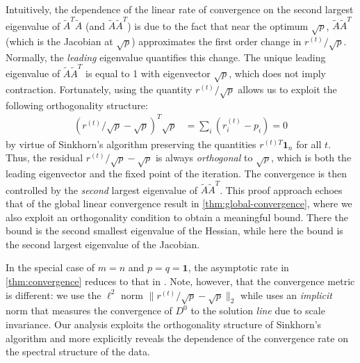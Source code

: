 Intuitively, the dependence of the linear rate of convergence on the second largest eigenvalue of $\tilde{A}^T\tilde{A}$ (and $\tilde{A}\tilde{A}^T$) is due to the fact that near the optimum $\sqrt{p}$, $\tilde{A}\tilde{A}^T$ (which is the Jacobian at $\sqrt{p}$) approximates the first order change in $r^{(t)}/\sqrt{p}$. Normally, the \emph{leading} eigenvalue quantifies this change. The unique leading eigenvalue of $\tilde{A}\tilde{A}^T$ is equal to 1 with eigenvector $\sqrt{p}$, which does not imply contraction. Fortunately, using the quantity  $r^{(t)}/\sqrt{p}$
allows us to exploit the following orthogonality structure:
\begin{align*}
(r^{(t)}/\sqrt{p}-\sqrt{p})^{T}\sqrt{p} & =\sum_{i}(r_{i}^{(t)}-p_{i})=0
\end{align*}
by virtue of Sinkhorn's algorithm preserving the quantities $r^{(t)T}\mathbf{1}_{n}$
for all $t$. Thus, the residual $r^{(t)}/\sqrt{p}-\sqrt{p}$ is always \emph{orthogonal} to
$\sqrt{p}$, which is both the leading eigenvector and the fixed point of the iteration. The convergence is then controlled by the \emph{second} largest eigenvalue of $\tilde{A}\tilde{A}^T$. This proof approach echoes that of the global linear convergence result in \cref{thm:global-convergence}, where we also exploit an orthogonality condition to obtain a meaningful bound. There the bound is the second smallest eigenvalue of the Hessian, while here the bound is the second largest eigenvalue of the Jacobian. 

In the special case of $m=n$ and $p=q=\mathbf{1}$, the asymptotic rate in \cref{thm:convergence} reduces to that in \citet{knight2008sinkhorn}. Note, however, that the convergence metric is different: we use the $\ell^2$ norm $\|r^{(t)}/\sqrt{p}-\sqrt{p}\|_2$ while \citet{knight2008sinkhorn} uses an \emph{implicit} norm that measures the convergence of $D^0$ to the solution \emph{line} due to scale invariance. Our analysis exploits the orthogonality structure of Sinkhorn's algorithm and more explicitly reveals the dependence of the convergence rate on the spectral structure of the data. 

